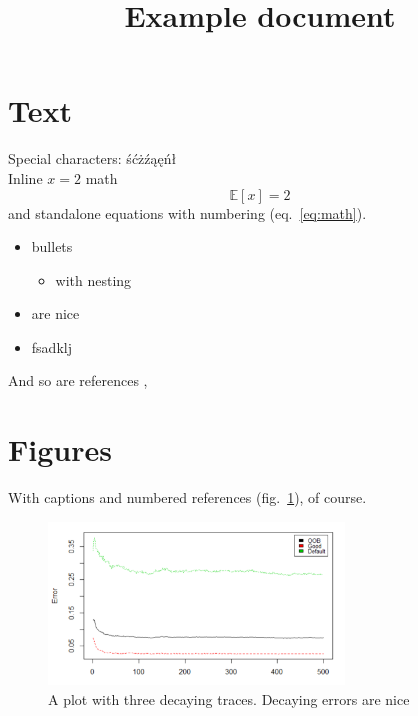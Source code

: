 \documentclass[a4paper]{article}
\title{Example document}
\date{}
\begin{document}
\maketitle

\newcommand{\E}{\mathbb{E}}

\section{Text}

Special characters: śćżźąęńł\\
Inline $x=2$ math
\begin{equation}
\E[x]=2
\label{eq:math}\end{equation}
and standalone equations with numbering (eq.~\ref{eq:math}).

\begin{itemize}
  \item bullets

  \begin{itemize}
      \item with nesting
  \end{itemize}
  \item are nice
  \item fsadklj
\end{itemize}

And so are references \autocite{ntk_paper}, \autocite{distill_gp}

\section{Figures}

With captions and numbered references (fig.~\ref{fig:figure}), of course.

\begin{figure}
\centering
\includegraphics[width=0.7\textwidth]{figure.png}
\caption{A plot with three decaying traces.
Decaying errors are nice
\label{fig:figure}
}
\end{figure}
\end{document}
